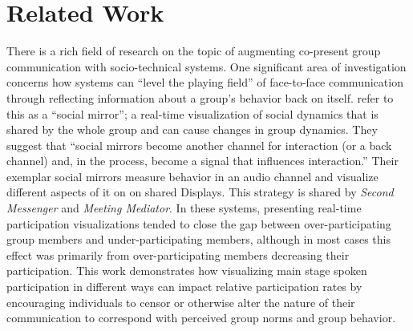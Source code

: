 \section{Related Work}




There is a rich field of research on the topic of augmenting co-present group communication with socio-technical systems.  One significant area of investigation concerns how systems can ``level the playing field'' of face-to-face communication through reflecting information about a group's behavior back on itself. \citet{Karahalios:hu} refer to this as a ``social mirror''; a real-time visualization of social dynamics that is shared by the whole group and can cause changes in group dynamics. They suggest that ``social mirrors become another channel for interaction (or a back channel) and, in the process, become a signal that influences interaction.'' Their exemplar social mirrors measure behavior in an audio channel and visualize different aspects of it on on shared Displays. This strategy is shared by \emph{Second Messenger}\citep{DiMicco:2007ie} and \emph{Meeting Mediator}\citep{Kim:2008ip}.  In these systems, presenting real-time participation visualizations tended to close the gap between over-participating group members and under-participating members, although in most cases this effect was primarily from over-participating members decreasing their participation. This work demonstrates how visualizing main stage spoken participation in different ways can impact relative participation rates by encouraging individuals to censor or otherwise alter the nature of their communication to correspond with perceived group norms and group behavior.

